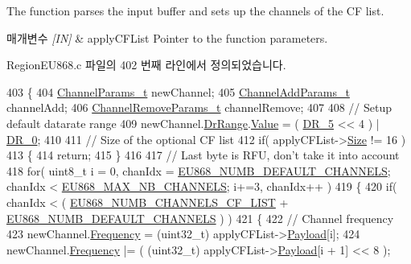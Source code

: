 The function parses the input buffer and sets up the channels of the CF list. 


\begin{DoxyParams}{매개변수}
{\em \mbox{[}\+I\+N\mbox{]}} & apply\+C\+F\+List Pointer to the function parameters. \\
\hline
\end{DoxyParams}


Region\+E\+U868.\+c 파일의 402 번째 라인에서 정의되었습니다.


\begin{DoxyCode}
403 \{
404     \mbox{\hyperlink{structs_channel_params}{ChannelParams\_t}} newChannel;
405     \mbox{\hyperlink{structs_channel_add_params}{ChannelAddParams\_t}} channelAdd;
406     \mbox{\hyperlink{structs_channel_remove_params}{ChannelRemoveParams\_t}} channelRemove;
407 
408     \textcolor{comment}{// Setup default datarate range}
409     newChannel.\mbox{\hyperlink{structs_channel_params_ad4d9b041ea740886a05fa8a1d06997a2}{DrRange}}.\mbox{\hyperlink{unionu_dr_range_ae1e3e8696366e3256e397bbdc4e34775}{Value}} = ( \mbox{\hyperlink{group___r_e_g_i_o_n_ga872e12c82020c02a7f70a1c6ed1375df}{DR\_5}} << 4 ) | \mbox{\hyperlink{group___r_e_g_i_o_n_ga6c4ef966b4f3d5eb7597b087f2b97095}{DR\_0}};
410 
411     \textcolor{comment}{// Size of the optional CF list}
412     \textcolor{keywordflow}{if}( applyCFList->\mbox{\hyperlink{structs_apply_c_f_list_params_ace31de7598e85e87624c4e7d8e5d112c}{Size}} != 16 )
413     \{
414         \textcolor{keywordflow}{return};
415     \}
416 
417     \textcolor{comment}{// Last byte is RFU, don't take it into account}
418     \textcolor{keywordflow}{for}( uint8\_t i = 0, chanIdx = \mbox{\hyperlink{group___r_e_g_i_o_n_e_u868_ga43b13bdefab43add062b907facaef8ba}{EU868\_NUMB\_DEFAULT\_CHANNELS}}; chanIdx < 
      \mbox{\hyperlink{group___r_e_g_i_o_n_e_u868_gaf94c3090ac541fec3c97b2146702d252}{EU868\_MAX\_NB\_CHANNELS}}; i+=3, chanIdx++ )
419     \{
420         \textcolor{keywordflow}{if}( chanIdx < ( \mbox{\hyperlink{group___r_e_g_i_o_n_e_u868_gad3cd171e0308aa36be7231a3fcba36b8}{EU868\_NUMB\_CHANNELS\_CF\_LIST}} + 
      \mbox{\hyperlink{group___r_e_g_i_o_n_e_u868_ga43b13bdefab43add062b907facaef8ba}{EU868\_NUMB\_DEFAULT\_CHANNELS}} ) )
421         \{
422             \textcolor{comment}{// Channel frequency}
423             newChannel.\mbox{\hyperlink{structs_channel_params_ade3d190636488dad9a89b19446b7acf1}{Frequency}} = (uint32\_t) applyCFList->\mbox{\hyperlink{structs_apply_c_f_list_params_a3dfbfe76c8f3bd25765750487b815147}{Payload}}[i];
424             newChannel.\mbox{\hyperlink{structs_channel_params_ade3d190636488dad9a89b19446b7acf1}{Frequency}} |= ( (uint32\_t) applyCFList->\mbox{\hyperlink{structs_apply_c_f_list_params_a3dfbfe76c8f3bd25765750487b815147}{Payload}}[i + 1] << 8 );

\end{DoxyCode}
